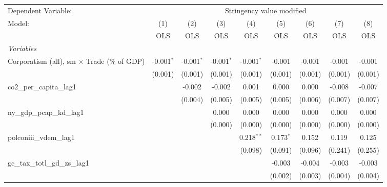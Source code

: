 
\begingroup
\centering
\begin{tabular}{lcccccccc}
   \toprule
   Dependent Variable: & \multicolumn{8}{c}{Stringency value modified}\\
   Model:                                             & (1)          & (2)          & (3)          & (4)          & (5)         & (6)     & (7)     & (8)\\  
                                                      &  OLS         & OLS          & OLS          & OLS          & OLS         & OLS     & OLS     & OLS\\  
   \midrule
   \emph{Variables}\\
   Corporatism (all), sm $\times$ Trade (\% of GDP)   & -0.001$^{*}$ & -0.001$^{*}$ & -0.001$^{*}$ & -0.001$^{*}$ & -0.001      & -0.001  & -0.001  & -0.001\\   
                                                      & (0.001)      & (0.001)      & (0.001)      & (0.001)      & (0.001)     & (0.001) & (0.001) & (0.001)\\   
   co2\_per\_capita\_lag1                             &              & -0.002       & -0.002       & 0.001        & 0.000       & 0.000   & -0.008  & -0.007\\   
                                                      &              & (0.004)      & (0.005)      & (0.005)      & (0.005)     & (0.006) & (0.007) & (0.007)\\   
   ny\_gdp\_pcap\_kd\_lag1                            &              &              & 0.000        & 0.000        & 0.000       & 0.000   & 0.000   & 0.000\\   
                                                      &              &              & (0.000)      & (0.000)      & (0.000)     & (0.000) & (0.000) & (0.000)\\   
   polconiii\_vdem\_lag1                              &              &              &              & 0.218$^{**}$ & 0.173$^{*}$ & 0.152   & 0.119   & 0.125\\   
                                                      &              &              &              & (0.098)      & (0.091)     & (0.096) & (0.241) & (0.255)\\   
   gc\_tax\_totl\_gd\_zs\_lag1                        &              &              &              &              & -0.003      & -0.004  & -0.003  & -0.003\\   
                                                      &              &              &              &              & (0.002)     & (0.003) & (0.004) & (0.004)\\   

\end{tabular}
